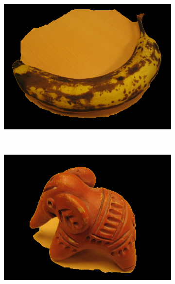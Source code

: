 \documentclass[10pt,twocolumn,letterpaper]{article}
\begin{document}
\begin{figure}[t]
\begin{subfigure}[b]{0.15\textwidth}
                \includegraphics[width=\textwidth]{figures/segmentations/banana1.png}
        \end{subfigure}%
        ~
        \begin{subfigure}[b]{0.15\textwidth}
                \includegraphics[width=\textwidth]{figures/segmentations/elefant.png}
        \end{subfigure}%
    

\end{figure}
\end{document}
